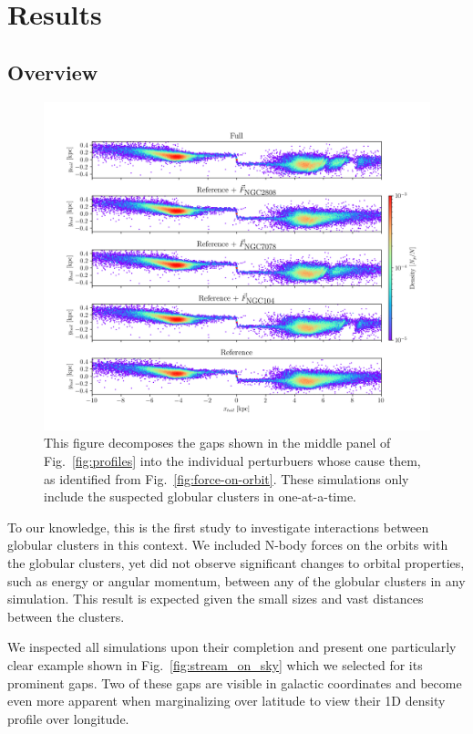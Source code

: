 \documentclass[draft]{aa}
\begin{document}
\section{Results}



  \subsection*{Overview}

    \begin{figure}
      \centering
      \includegraphics[width=\linewidth]{decomposition-monte-carlo-009-with-3-gaps.png}
      \caption{This figure decomposes the gaps shown in the middle panel of Fig.~\ref{fig:profiles} into the individual perturbuers whose cause them, as identified from Fig.~\ref{fig:force-on-orbit}. These simulations only include the suspected globular clusters in one-at-a-time.}
      \label{fig:decomposition}
    \end{figure} 

    To our knowledge, this is the first study to investigate interactions between globular clusters in this context. We included N-body forces on the orbits with the globular clusters, yet did not observe significant changes to orbital properties, such as energy or angular momentum, between any of the globular clusters in any simulation. This result is expected given the small sizes and vast distances between the clusters.

    We inspected all simulations upon their completion and present one particularly clear example shown in Fig.~\ref{fig:stream_on_sky} which we selected for its prominent gaps. Two of these gaps are visible in galactic coordinates and become even more apparent when marginalizing over latitude to view their 1D density profile over longitude.
    
\end{document}
